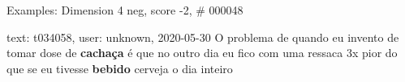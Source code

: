 \begin{frame}{Examples: Dimension 4 neg, score -2, \# 000048}
\footnotesize
\begin{alertblock}{text: t034058, user: unknown, 2020-05-30}
O problema de quando eu invento de tomar dose de \textbf{cachaça} é que no 
outro dia eu fico com uma ressaca 3x pior do que se eu tivesse \textbf{bebido} 
cerveja o dia inteiro 
\end{alertblock}
\end{frame}
